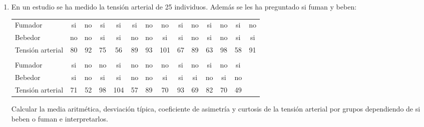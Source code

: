 \begin{enumerate}[leftmargin=*]
\item En un estudio se ha medido la tensión arterial de 25 individuos. Además se les ha preguntado si fuman y beben:
\begin{center}
\begin{tabular}{lccccccccccccc}
\hline
Fumador  & si & no & si & si & si & no & no & si & no & si & no & si & no \\
Bebedor & no & no & si & si & no & no & si & si & no & si & no & si & si \\
Tensión arterial & 80 & 92 & 75 & 56 & 89 & 93 & 101 & 67 & 89 & 63 & 98 & 58 & 91 \\
\hline
\\
\hline
Fumador  & si & no & no & si & no & no & no & si & no & si & no & si \\
Bebedor & si & no & si & si & no & no & si & si & si & no & si & no \\
Tensión arterial & 71 & 52 & 98 & 104 & 57 & 89 & 70 & 93 & 69 & 82 & 70 & 49 \\
\hline
\end{tabular}
\end{center}

Calcular la media aritmética, desviación típica, coeficiente de asimetría y curtosis de la tensión arterial por
grupos dependiendo de si beben o fuman e interpretarlos.


\end{enumerate}
